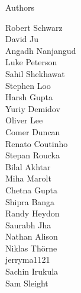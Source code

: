 \documentclass[xcolor=svgnames]{beamer}
\begin{document}
\begin{frame}{Authors}
\begin{multicols}{5}
          Robert Schwarz\\
          David Ju\\
          Angadh Nanjangud\\
          Luke Peterson\\
          Sahil Shekhawat\\
          Stephen Loo\\
          Harsh Gupta\\
          Yuriy Demidov\\
          Oliver Lee\\
          Comer Duncan\\
          Renato Coutinho\\
          Stepan Roucka\\
          Bilal Akhtar\\
          Miha Marolt\\
          Chetna Gupta\\
          Shipra Banga\\
          Randy Heydon\\
          Saurabh Jha\\
          Nathan Alison\\
          Niklas Thörne\\
          jerryma1121\\
          Sachin Irukula\\
          Sam Sleight\\
    \end{multicols}
  \end{frame}
\end{document}

